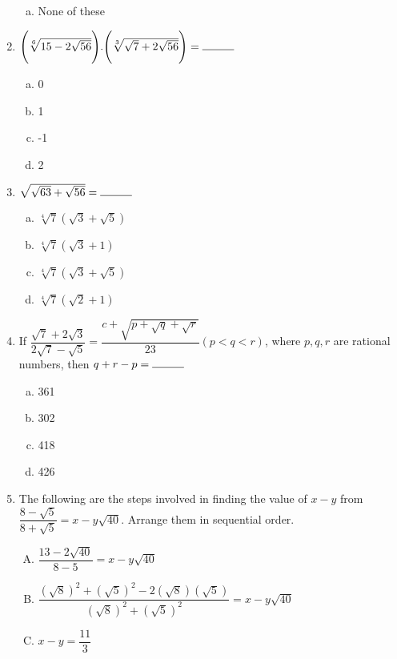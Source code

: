 \begin{multicols}{2}
\begin{enumerate}
\begin{multicols}{2}
\begin{enumerate}[(a)]
\item None of these
\end{enumerate}
\end{multicols}
\item $\Bigg(\sqrt[6]{15-2\sqrt{56}}\Bigg).\Bigg(\sqrt[3]{\sqrt{7}+2\sqrt{56}}\Bigg) = \rule{1cm}{0.15mm}$
\begin{multicols}{2}
\begin{enumerate}[(a)]
\item 0
\item 1
\item -1
\item 2
\end{enumerate}
\end{multicols}
\item $\sqrt{\sqrt{63}+\sqrt{56}} = \rule{1cm}{0.15mm}$
\begin{multicols}{2}
\begin{enumerate}[(a)]
\item $\sqrt[4]{7}(\sqrt{3}+\sqrt{5})$
\item $\sqrt[4]{7}(\sqrt{3}+1)$
\item $\sqrt[4]{7}(\sqrt{3}+\sqrt{5})$
\item $\sqrt[4]{7}(\sqrt{2}+1)$
\end{enumerate}
\end{multicols}
\item If $\dfrac{\sqrt{7}+2\sqrt{3}}{2\sqrt{7}-\sqrt{5}} = \dfrac{c+\sqrt{p+\sqrt{q}+\sqrt{r}}}{23} (p < q < r)$, where $p, q, r$ are rational numbers, then $q+r-p = \rule{1cm}{0.15mm}$
\begin{enumerate}[(a)]
\item 361
\item 302
\item 418
\item 426
\end{enumerate}
\item The following are the steps involved in finding the value of $x-y$ from $\dfrac{8-\sqrt{5}}{8+\sqrt{5}} = x-y\sqrt{40}$. Arrange them in sequential order.
\begin{enumerate}[(A)]
\item $\dfrac{13-2\sqrt{40}}{8-5} = x-y\sqrt{40}$
\item $\dfrac{(\sqrt{8})^2+(\sqrt{5})^2-2(\sqrt{8})(\sqrt{5})}{(\sqrt{8})^2+(\sqrt{5})^2} = x-y\sqrt{40}$
\item $x-y = \dfrac{11}{3}$

\end{enumerate}
\end{enumerate}
\end{multicols}
